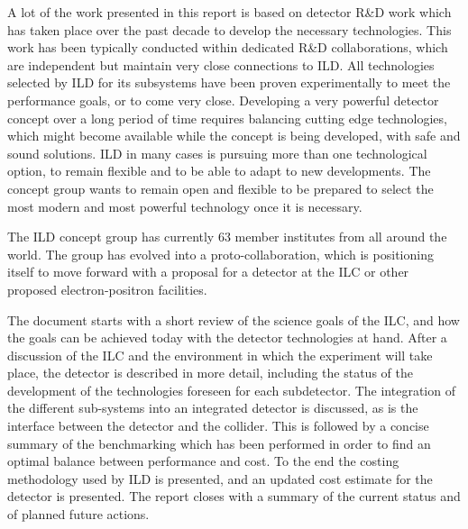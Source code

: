 A lot of the work presented in this report is based on detector R\&D work which has taken place over the past decade to develop the necessary technologies. 
This work has been typically conducted within dedicated R\&D collaborations, which are independent but maintain very close connections to ILD. All technologies selected by ILD for its subsystems have been proven experimentally to meet the performance goals, or to come very close. Developing a very powerful detector concept over a long period of time requires balancing cutting edge technologies, which might become available while the concept is being developed, with safe and sound solutions. ILD in many cases is pursuing more than one technological option, to remain flexible and to be able to adapt to new developments. The concept group  wants to remain open and flexible to be prepared to select the most modern and most powerful technology once it is necessary. 

The ILD concept group has currently 63 member institutes from all around the world. The group has evolved into a proto-collaboration, which is positioning itself to move forward with a proposal for a detector at the ILC or other proposed electron-positron facilities.

The document starts with a short review of the science goals of the ILC, and how the goals can be achieved today with the detector technologies at hand. After a discussion of the ILC and the environment in which the experiment will take place, the detector is described in more detail, including the status of the development of the technologies foreseen for each subdetector. The integration of the different sub-systems into an integrated detector is discussed, as is the interface between the detector and the collider. This is followed by a concise summary of the benchmarking which has been performed in order to find an optimal balance between performance and cost. To the end the costing methodology used by ILD is presented, and an updated cost estimate for the detector is presented. The report closes with a summary of the current status and of planned future actions. 

